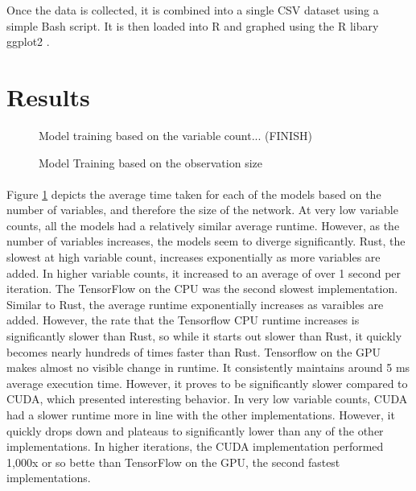 \documentclass[12pt]{article}
\begin{document}
Once the data is collected, it is combined into a single CSV dataset using a simple Bash script.
It is then loaded into R \cite{lang_r} and graphed using the R libary ggplot2 \cite{lib_ggplot2}.

\section{Results}

\begin{figure}
	\begin{center}
		
	\end{center}
	\caption{Model training based on the variable count... (FINISH)}
	\label{fig:graph:variables}
\end{figure}

\begin{figure}
	\begin{center}
		
	\end{center}
	\caption{Model Training based on the observation size}
	\label{fig:graph:observations}
\end{figure}

\paragraph{}
Figure \ref{fig:graph:variables} depicts the average time taken for each of the models based on the number of variables, and therefore the size of the network.
At very low variable counts, all the models had a relatively similar average runtime.
However, as the number of variables increases, the models seem to diverge significantly.
Rust, the slowest at high variable count, increases exponentially as more variables are added.
In higher variable counts, it increased to an average of over 1 second per iteration.
The TensorFlow on the CPU was the second slowest implementation.
Similar to Rust, the average runtime exponentially increases as varaibles are added.
However, the rate that the Tensorflow CPU runtime increases is significantly slower than Rust, so while it starts out slower than Rust, it quickly becomes nearly hundreds of times faster than Rust.
Tensorflow on the GPU makes almost no visible change in runtime.
It consistently maintains around 5 ms average execution time.
However, it proves to be significantly slower compared to CUDA, which presented interesting behavior.
In very low variable counts, CUDA had a slower runtime more in line with the other implementations.
However, it quickly drops down and plateaus to significantly lower than any of the other implementations.
In higher iterations, the CUDA implementation performed 1,000x or so bette than TensorFlow on the GPU, the second fastest implementations.
\end{document}
